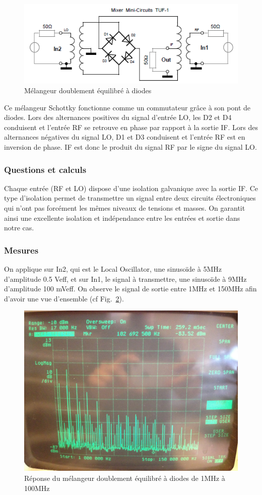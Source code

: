 \documentclass{article}
\begin{document}
\begin{figure}[h!]
	\centering
	\includegraphics[width=.7\textwidth]{schema_melangeur_doublediode}
	\caption{Mélangeur doublement équilibré à diodes}
	\label{fig:schema_melangeur_doublediode}
\end{figure}

Ce mélangeur Schottky fonctionne comme un commutateur grâce à son pont de diodes. Lors des alternances positives du signal d'entrée LO,  les D2 et D4 conduisent  et l'entrée RF se retrouve en phase  par rapport à la sortie IF. Lors des alternances négatives du signal LO, D1 et D3 conduisent et l'entrée RF est en inversion de phase. IF est donc le produit du signal RF par le signe du signal LO.

\subsubsection{Questions et calculs}


Chaque entrée (RF et LO) dispose d'une isolation galvanique avec la sortie IF. Ce type d'isolation permet de transmettre un signal entre deux circuits électroniques qui n'ont pas forcément les mêmes niveaux de tensions et masses. On garantit ainsi une excellente isolation et indépendance entre les entrées et sortie dans notre cas.

\subsubsection{Mesures}


On applique sur In2, qui est le Local Oscillator, une sinusoïde à 5MHz d’amplitude  0.5 Veff, et sur In1, le signal à transmettre, une sinusoïde à 9MHz d'amplitude 100 mVeff.
On observe le signal de sortie entre 1MHz et 150MHz afin d'avoir une vue d'ensemble (cf Fig.~\ref{fig:9_3_1}).

\begin{figure}[h!]
	\centering
	\includegraphics[width=.7\textwidth]{9_3_1}
	\caption{Réponse du mélangeur doublement équilibré à diodes de 1MHz à 100MHz}
	\label{fig:9_3_1}
\end{figure}
\end{document}
